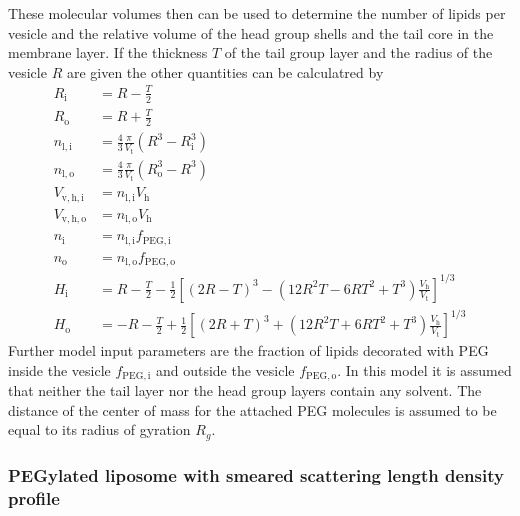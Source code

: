 These molecular volumes then can be used to determine the number of lipids per vesicle and the relative volume of the head group shells and the tail core in the membrane layer. If the thickness $T$ of the tail group layer and the radius of the vesicle $R$ are given the other quantities can be calculatred by
\begin{align}
R_\mathrm{i} &= R-\frac T2 \\
R_\mathrm{o} &= R+\frac T2 \\
n_\mathrm{l,i} &= \frac43 \frac{\pi}{V_\mathrm{t}} \left(R^3-R_\mathrm{i}^3\right) \\
n_\mathrm{l,o} &= \frac43 \frac{\pi}{V_\mathrm{t}} \left(R_\mathrm{o}^3-R^3\right) \\
V_\mathrm{v,h,i} &= n_\mathrm{l,i} V_\mathrm{h} \\
V_\mathrm{v,h,o} &= n_\mathrm{l,o} V_\mathrm{h} \\
n_\mathrm{i} &= n_\mathrm{l,i} f_\mathrm{PEG,i} \\
n_\mathrm{o} &= n_\mathrm{l,o} f_\mathrm{PEG,o} \\
H_\mathrm{i} & =  R - \frac T2 - \frac12 \left[\left(2R-T\right)^3 - \left(12R^2T-6RT^2+T^3\right)\frac{V_\mathrm{h}}{V_\mathrm{t}}\right]^{1/3} \\
H_\mathrm{o} & = -R - \frac T2 + \frac12 \left[\left(2R+T\right)^3 + \left(12R^2T+6RT^2+T^3\right)\frac{V_\mathrm{h}}{V_\mathrm{t}}\right]^{1/3}
\end{align}
Further model input parameters are the fraction of lipids decorated with PEG inside the vesicle $f_\mathrm{PEG,i}$ and outside the vesicle  $f_\mathrm{PEG,o}$.
In this model it is assumed that neither the tail layer nor the head group layers contain any solvent. The distance of the center of mass for the attached PEG molecules is assumed to be equal to its radius of gyration $R_g$.
~\\
\subsubsection{PEGylated liposome with smeared scattering length density profile} ~\\

